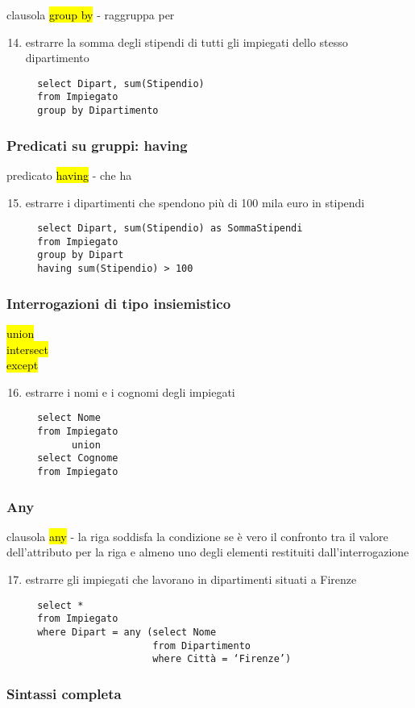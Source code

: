 \documentclass[a4paper]{article}
\begin{document}
clausola \hl{group by} - raggruppa per
\begin{enumerate}
  \setcounter{enumi}{13}
  \item estrarre la somma degli stipendi di tutti gli impiegati dello stesso dipartimento
  \begin{verbatim}
  select Dipart, sum(Stipendio)
  from Impiegato
  group by Dipartimento
  \end{verbatim}
\end{enumerate}\par \subsubsection{Predicati su gruppi: having}
predicato \hl{having} - che ha
\begin{enumerate}
  \setcounter{enumi}{14}
  \item estrarre i dipartimenti che spendono più di 100 mila euro in stipendi
  \begin{verbatim}
  select Dipart, sum(Stipendio) as SommaStipendi
  from Impiegato
  group by Dipart
  having sum(Stipendio) > 100
  \end{verbatim}
\end{enumerate}\par \subsubsection{Interrogazioni di tipo insiemistico}
\hl{union}\\
\hl{intersect}\\
\hl{except}
\begin{enumerate}
  \setcounter{enumi}{15}
  \item estrarre i nomi e i cognomi degli impiegati
  \begin{verbatim}
  select Nome
  from Impiegato
        union
  select Cognome
  from Impiegato
  \end{verbatim}
\end{enumerate}\par \subsubsection{Any}
clausola \hl{any} - la riga soddisfa la condizione se è vero il confronto tra il valore dell’attributo per la riga e almeno uno degli elementi restituiti dall’interrogazione
\begin{enumerate}
  \setcounter{enumi}{16}
  \item estrarre gli impiegati che lavorano in dipartimenti situati a Firenze
  \begin{verbatim}
  select *
  from Impiegato
  where Dipart = any (select Nome
                      from Dipartimento
                      where Città = ‘Firenze’)
  \end{verbatim}
\end{enumerate}\par \subsubsection{Sintassi completa}
\end{document}

